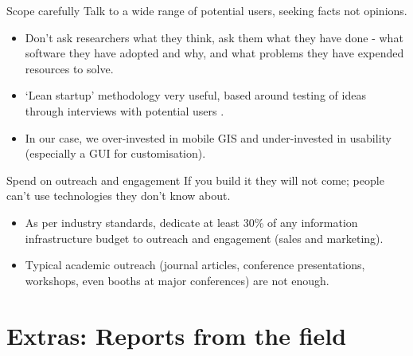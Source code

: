 \documentclass[aspectratio=169, 12pt]{beamer} %
\begin{document}
\begin{frame}{Scope carefully}
  Talk to a wide range of potential users, seeking facts not opinions.
      \begin{itemize}[label=\textbullet]
        \item Don’t ask researchers what they think, ask them what they have done - what software they have adopted and why, and what problems they have expended resources to solve. 
        \item ‘Lean startup’ methodology very useful, based around  testing of ideas through interviews with potential users \cite{Strategyzer_AG2019-uu}.
        \item In our case, we over-invested in mobile GIS and under-invested in usability (especially a GUI for customisation).
    \end{itemize}
\end{frame}

\begin{frame}{Spend on outreach and engagement}
  If you build it they will not come; people can't use technologies they don't know about.
      \begin{itemize}[label=\textbullet]
        \item As per industry standards, dedicate at least 30\% of any information infrastructure budget to outreach and engagement (sales and marketing). 
        \item Typical academic outreach (journal articles, conference presentations, workshops, even booths at major conferences) are not enough.
    \end{itemize}
\end{frame}

\section{Extras: Reports from the field}
\end{document}
